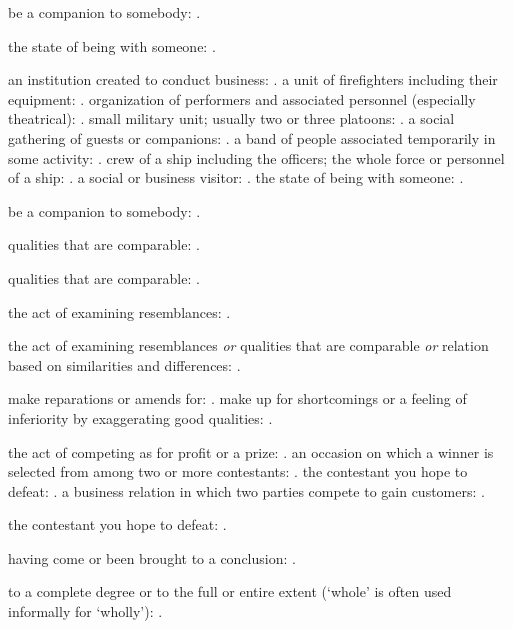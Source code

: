   be a companion to somebody: .

  the state of being with someone: .

  an institution created to conduct business: . a unit of firefighters including their equipment: . organization of performers and associated personnel (especially theatrical): . small military unit; usually two or three platoons: . a social gathering of guests or companions: . a band of people associated temporarily in some activity: . crew of a ship including the officers; the whole force or personnel of a ship: . a social or business visitor: . the state of being with someone: .

  be a companion to somebody: .

  qualities that are comparable: .

  qualities that are comparable: .

  the act of examining resemblances: .

  the act of examining resemblances \textit{or} qualities that are comparable \textit{or} relation based on similarities and differences: .

  make reparations or amends for: . make up for shortcomings or a feeling of inferiority by exaggerating good qualities: .

  the act of competing as for profit or a prize: . an occasion on which a winner is selected from among two or more contestants: . the contestant you hope to defeat: . a business relation in which two parties compete to gain customers: .

  the contestant you hope to defeat: .

  having come or been brought to a conclusion: .

  to a complete degree or to the full or entire extent (`whole' is often used informally for `wholly'): .

